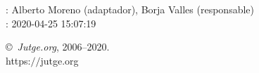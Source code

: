 \documentclass[11pt]{article}
\begin{document}
    \newcommand{\SampleTwoCol}{}
    \newcommand{\SampleOneCol}{}

    \ProblemInformation
    \Author: Alberto Moreno (adaptador), Borja Valles (responsable)\\    
    \Generation: 2020-04-25 15:07:19

    \bigskip

    \copyright\ \emph{Jutge.org}, 2006--2020. \\
    https:$/\!\!/$jutge.org
\end{document}
